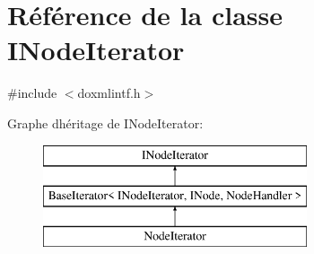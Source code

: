 \hypertarget{class_i_node_iterator}{}\section{Référence de la classe I\+Node\+Iterator}
\label{class_i_node_iterator}


{\ttfamily \#include $<$doxmlintf.\+h$>$}

Graphe d\textquotesingle{}héritage de I\+Node\+Iterator\+:\begin{figure}[H]
\begin{center}
\leavevmode
\includegraphics[height=3.000000cm]{class_i_node_iterator}
\end{center}
\end{figure}
